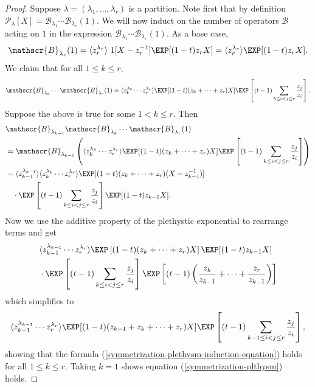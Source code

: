 \begin{proof}
Suppose $\lambda = (\lambda_1,\ldots, \lambda_r)$ is a partition.    
Note first that by definition $ \mathcal{P}_{\lambda}[X] = \mathscr{B}_{\lambda_1}\cdots \mathscr{B}_{\lambda_r}(1).$ We will now induct on the number of operators $\mathscr{B}$ acting on $1$ in the expression $\mathscr{B}_{\lambda_1}\cdots \mathscr{B}_{\lambda_r}(1).$ As a base case,  
\[\mathscr{B}_{\lambda_r}(1) = \langle z_r ^{\lambda_r} \rangle ~1[X-z_{r}^{-1}]\EXP[(1-t)z_rX] = \langle z_r ^{\lambda_r} \rangle \EXP[(1-t)z_rX].\]
We claim that for all $1\leq k \leq r$,
\begin{equation} \label{symmetrization-plethysm-induction-equation}
    \mathscr{B}_{\lambda_k}\cdots \mathscr{B}_{\lambda_r}(1) = \langle z_{k}^{\lambda_{k}} \cdots z_r^{\lambda_r} \rangle \EXP[(1-t)(z_k+\cdots +z_r)X]\EXP\left[(t-1)\sum_{k\leq i<j\leq r}\frac{z_j}{z_i}\right].
\end{equation}
Suppose the above is true for some $1< k \leq r$. Then 
\begin{align*}
    &\mathscr{B}_{\lambda_{k-1}}\mathscr{B}_{\lambda_k}\cdots \mathscr{B}_{\lambda_r}(1)  \\
    &= \mathscr{B}_{\lambda_{k-1}} \left( \langle z_{k}^{\lambda_{k}} \cdots z_r^{\lambda_r} \rangle \EXP[(1-t)(z_k+\cdots +z_r)X]\EXP\left[(t-1)\sum_{k\leq i<j\leq r}\frac{z_j}{z_i}\right] \right) \\
   &=  \langle z_{k-1}^{\lambda_{k-1}} \rangle  \langle z_{k}^{\lambda_{k}} \cdots z_r^{\lambda_r} \rangle \EXP[(1-t)(z_k+\cdots +z_r)(X-z_{k-1}^{-1})] \\ &\quad  \cdot \EXP\left[(t-1)\sum_{k\leq i<j\leq r}\frac{z_j}{z_i}\right] \EXP[(1-t)z_{k-1}X].
\end{align*}
Now we use the additive property of the plethystic exponential to rearrange terms and get
\begin{equation*}
\begin{split}
    &\langle z_{k-1}^{\lambda_{k-1}} \cdots z_r^{\lambda_r} \rangle \EXP\left[(1-t)(z_k+\cdots +z_r)X\right] \EXP[(1-t)z_{k-1}X] \\
    &\cdot \EXP\left[(t-1)\sum_{k\leq i<j\leq r}\frac{z_j}{z_i}\right]\EXP\left[(t-1)\left(\frac{z_k}{z_{k-1}}+\cdots +\frac{z_r}{z_{k-1}}\right)\right]
\end{split}
\end{equation*}
    which simplifies to 
$$ \langle z_{k-1}^{\lambda_{k-1}} \cdots z_r^{\lambda_r} \rangle \EXP[(1-t)(z_{k-1}+z_k+\cdots +z_r)X] \EXP\left[(t-1)\sum_{k-1\leq i<j\leq r}\frac{z_j}{z_i}\right],$$ showing that the formula (\ref{symmetrization-plethysm-induction-equation}) holds for all $1\leq k\leq r$. Taking $k=1$ shows equation (\ref{symmetrization-plthysm}) holds.
\end{proof}

